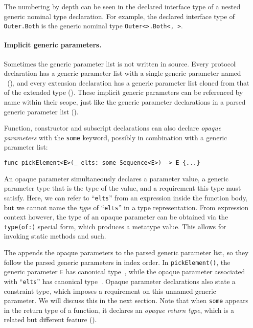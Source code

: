 \documentclass[../generics]{subfiles}
\begin{document}
The numbering by depth can be seen in the declared interface type of a nested generic nominal type declaration. For example, the declared interface type of \texttt{Outer.Both} is the generic nominal type \texttt{Outer<>.Both<, >}.

\paragraph{Implicit generic parameters.} Sometimes the generic parameter list is not written in source. Every protocol declaration has a generic parameter list with a single generic parameter named \IndexSelf\tSelf\ (), and every extension declaration has a generic parameter list cloned from that of the extended type (). These implicit generic parameters can be referenced by name within their scope, just like the generic parameter declarations in a parsed generic parameter list ().

Function, constructor and subscript declarations can also declare \emph{opaque parameters} with the \texttt{some} keyword, possibly in combination with a generic parameter list:
\begin{Verbatim}
func pickElement<E>(_ elts: some Sequence<E>) -> E {...}
\end{Verbatim}
An opaque parameter simultaneously declares a parameter value, a generic parameter type that is the type of the value, and a requirement this type must satisfy. Here, we can refer to ``\texttt{elts}'' from an expression inside the function body, but we cannot name the \emph{type} of ``\texttt{elts}'' in a type representation. From expression context however, the type of an opaque parameter can be obtained via the \texttt{type(of:)} special form, which produces a metatype value. This allows for invoking static methods and such.

The  appends the opaque parameters to the parsed generic parameter list, so they follow the parsed generic parameters in index order. In \texttt{pickElement()}, the generic parameter \texttt{E} has canonical type~\rT, while the opaque parameter associated with ``\texttt{elts}'' has canonical type~\rU. Opaque parameter declarations also state a constraint type, which imposes a requirement on this unnamed generic parameter. We will discuss this in the next section. Note that when \texttt{some} appears in the return type of a function, it declares an \emph{opaque return type}, which is a related but different feature ().
\end{document}

